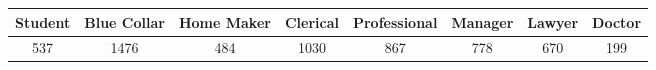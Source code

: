 \documentclass[]{article}
\begin{document}
\begin{longtable}[]{@{}cccccccc@{}}
\toprule
\begin{minipage}[b]{0.10\columnwidth}\centering\strut
Student\strut
\end{minipage} & \begin{minipage}[b]{0.09\columnwidth}\centering\strut
Blue Collar\strut
\end{minipage} & \begin{minipage}[b]{0.08\columnwidth}\centering\strut
Home Maker\strut
\end{minipage} & \begin{minipage}[b]{0.11\columnwidth}\centering\strut
Clerical\strut
\end{minipage} & \begin{minipage}[b]{0.15\columnwidth}\centering\strut
Professional\strut
\end{minipage} & \begin{minipage}[b]{0.10\columnwidth}\centering\strut
Manager\strut
\end{minipage} & \begin{minipage}[b]{0.09\columnwidth}\centering\strut
Lawyer\strut
\end{minipage} & \begin{minipage}[b]{0.09\columnwidth}\centering\strut
Doctor\strut
\end{minipage}\tabularnewline
\midrule
\endhead
\begin{minipage}[t]{0.10\columnwidth}\centering\strut
537\strut
\end{minipage} & \begin{minipage}[t]{0.09\columnwidth}\centering\strut
1476\strut
\end{minipage} & \begin{minipage}[t]{0.08\columnwidth}\centering\strut
484\strut
\end{minipage} & \begin{minipage}[t]{0.11\columnwidth}\centering\strut
1030\strut
\end{minipage} & \begin{minipage}[t]{0.15\columnwidth}\centering\strut
867\strut
\end{minipage} & \begin{minipage}[t]{0.10\columnwidth}\centering\strut
778\strut
\end{minipage} & \begin{minipage}[t]{0.09\columnwidth}\centering\strut
670\strut
\end{minipage} & \begin{minipage}[t]{0.09\columnwidth}\centering\strut
199\strut
\end{minipage}\tabularnewline
\bottomrule
\end{longtable}
\end{document}
